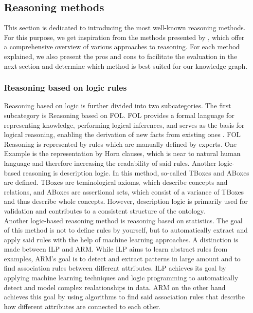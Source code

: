 \documentclass[
  a4paper,  %
  twoside,  %
  bibliography=totoc,
  headsepline,
  cleardoublepage=empty,
  parskip=half,
  draft=false
]{scrbook}
\begin{document}
\subsection{Reasoning methods}\label{sec:reasoning_types}
This section is dedicated to introducing the most well-known reasoning methods. For this purpose, we get inspiration from the methods presented by \cite{TIAN2022100159}, which offer a comprehensive overview of various approaches to reasoning. For each method explained, we also present the pros and cons to facilitate the evaluation in the next section and determine which method is best suited for our knowledge graph.

\subsubsection{Reasoning based on logic rules}
Reasoning based on logic is further divided into two subcategories. The first subcategory is Reasoning based on \acrfull{FOL}. \acrshort{FOL} provides a formal language for representing knowledge, performing logical inferences, and serves as the basis for logical reasoning, enabling the derivation of new facts from existing ones \cite{Fitting.1990}. \acrshort{FOL} Reasoning is represented by rules which are manually defined by experts. One Example is the representation by Horn clauses, which is near to natural human language and therefore increasing the readability of said rules. Another logic-based reasoning is description logic. In this method, so-called TBoxes and ABoxes are defined. TBoxes are teminological axioms, which describe concepts and relations, and ABoxes are assertional sets, which consist of a variance of TBoxes and thus describe whole concepts. However, description logic is primarily used for validation and contributes to a consistent structure of the ontology. \\
Another logic-based reasoning method is reasoning based on statistics. The goal of this method is not to define rules by yourself, but to automatically extract and apply said rules with the help of machine learning approaches. A distinction is made between \acrfull{ILP} and \acrfull{ARM}. While \acrshort{ILP} aims to learn abstract rules from examples, \acrshort{ARM}'s goal is to detect and extract patterns in large amount and to find association rules between different attributes. \acrshort{ILP} achieves its goal by applying machine learning techniques and logic programming to automatically detect and model complex realationships in data. \acrshort{ARM} on the other hand achieves this goal by using algorithms to find said association rules that describe how different attributes are connected to each other.
\end{document}
